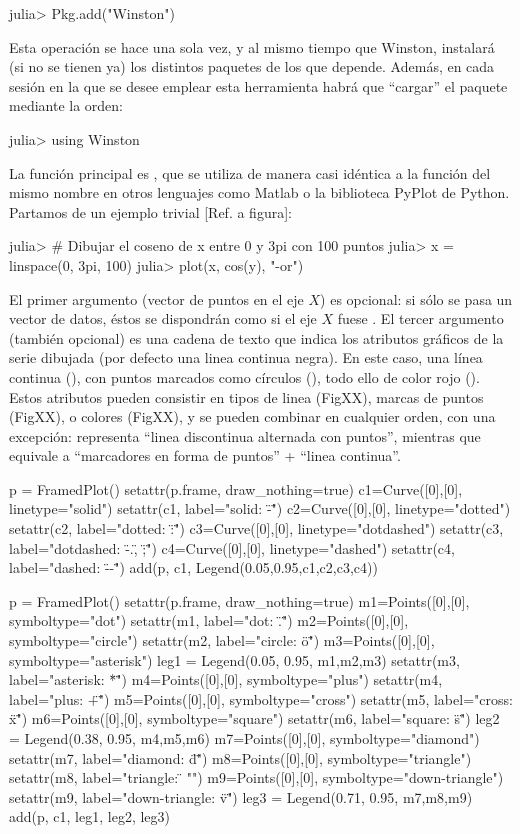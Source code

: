 ﻿\documentclass[spanish]{article}
\begin{document}
julia> Pkg.add("Winston")

Esta operación se hace una sola vez, y al mismo tiempo que Winston, instalará (si no se tienen ya) los distintos paquetes de los que depende. Además, en cada sesión en la que se desee emplear esta herramienta habrá que ``cargar'' el paquete mediante la orden:

julia> using Winston

La función principal es , que se utiliza de manera casi idéntica a la función del mismo nombre en otros lenguajes como Matlab o la biblioteca PyPlot de Python. Partamos de un ejemplo trivial [Ref. a figura]:

julia> # Dibujar el coseno de x entre 0 y 3pi con 100 puntos
julia> x = linspace(0, 3pi, 100)
julia> plot(x, cos(y), "-or")

El primer argumento (vector de puntos en el eje $X$) es opcional: si sólo se pasa un vector de datos, éstos se dispondrán como si el eje $X$ fuese \code{[1:length(y)]}. El tercer argumento (también opcional) es una cadena de texto que indica los atributos gráficos de la serie dibujada (por defecto una linea continua negra). En este caso, una línea continua (), con puntos marcados como círculos (), todo ello de color rojo (). Estos atributos pueden consistir en tipos de linea (FigXX), marcas de puntos (FigXX), o colores (FigXX), y se pueden combinar en cualquier orden, con una excepción:  representa ``linea discontinua alternada con puntos'', mientras que  equivale a ``marcadores en forma de puntos'' + ``linea continua''.


p = FramedPlot()
setattr(p.frame, draw_nothing=true)
c1=Curve([0],[0], linetype="solid")
setattr(c1, label="solid: \"-\"")
c2=Curve([0],[0], linetype="dotted")
setattr(c2, label="dotted: \":\"")
c3=Curve([0],[0], linetype="dotdashed")
setattr(c3, label="dotdashed: \"-.\", \";\"")
c4=Curve([0],[0], linetype="dashed")
setattr(c4, label="dashed: \"--\"")
add(p, c1, Legend(0.05,0.95,{c1,c2,c3,c4}))

p = FramedPlot()
setattr(p.frame, draw_nothing=true)
m1=Points([0],[0], symboltype="dot")
setattr(m1, label="dot: \".\"")
m2=Points([0],[0], symboltype="circle")
setattr(m2, label="circle: \"o\"")
m3=Points([0],[0], symboltype="asterisk")
leg1 = Legend(0.05, 0.95, {m1,m2,m3})
setattr(m3, label="asterisk: \"*\"")
m4=Points([0],[0], symboltype="plus")
setattr(m4, label="plus: \"+\"")
m5=Points([0],[0], symboltype="cross")
setattr(m5, label="cross: \"x\"")
m6=Points([0],[0], symboltype="square")
setattr(m6, label="square: \"s\"")
leg2 = Legend(0.38, 0.95, {m4,m5,m6})
m7=Points([0],[0], symboltype="diamond")
setattr(m7, label="diamond: \"d\"")
m8=Points([0],[0], symboltype="triangle")
setattr(m8, label="triangle: \"^^\"")
m9=Points([0],[0], symboltype="down-triangle")
setattr(m9, label="down-triangle: \"v\"")
leg3 = Legend(0.71, 0.95, {m7,m8,m9})
add(p, c1, leg1, leg2, leg3)
\end{document}
